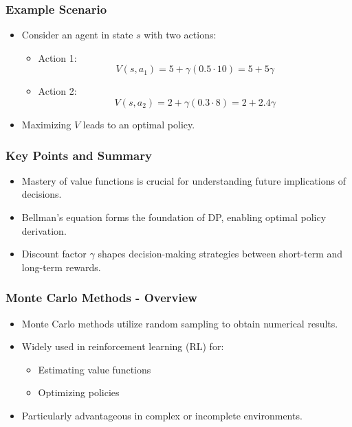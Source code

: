 \documentclass[aspectratio=169]{beamer}
\begin{document}
\begin{frame}[fragile]
    \frametitle{Example Scenario}
    \begin{itemize}
        \item Consider an agent in state \( s \) with two actions:
        \begin{itemize}
            \item Action 1: 
            \[
            V(s, a_1) = 5 + \gamma (0.5 \cdot 10) = 5 + 5\gamma
            \]
            \item Action 2: 
            \[
            V(s, a_2) = 2 + \gamma (0.3 \cdot 8) = 2 + 2.4\gamma
            \]
        \end{itemize}
        \item Maximizing \( V \) leads to an optimal policy.
    \end{itemize}
\end{frame}

\begin{frame}[fragile]
    \frametitle{Key Points and Summary}
    \begin{itemize}
        \item Mastery of value functions is crucial for understanding future implications of decisions.
        \item Bellman's equation forms the foundation of DP, enabling optimal policy derivation.
        \item Discount factor \( \gamma \) shapes decision-making strategies between short-term and long-term rewards.
    \end{itemize}
\end{frame}

\begin{frame}[fragile]
    \frametitle{Monte Carlo Methods - Overview}
    \begin{itemize}
        \item Monte Carlo methods utilize random sampling to obtain numerical results.
        \item Widely used in reinforcement learning (RL) for:
        \begin{itemize}
            \item Estimating value functions
            \item Optimizing policies
        \end{itemize}
        \item Particularly advantageous in complex or incomplete environments.
    \end{itemize}
\end{frame}
\end{document}
